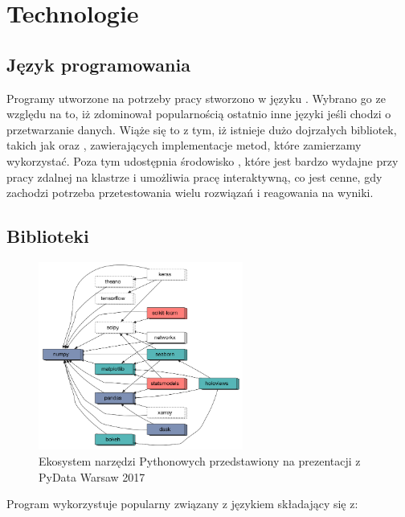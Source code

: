 \section{Technologie}\label{sec:technologie}

\subsection{Język programowania}

Programy utworzone na potrzeby pracy stworzono w języku . Wybrano go
ze względu na to, iż zdominował popularnością ostatnio inne języki jeśli chodzi o przetwarzanie danych.
Wiąże się to z tym, iż istnieje dużo dojrzałych bibliotek, takich jak 
oraz , zawierających implementacje metod, które zamierzamy wykorzystać.
Poza tym udostępnia środowisko , które jest bardzo wydajne przy
pracy zdalnej na klastrze i umożliwia pracę interaktywną, co jest cenne, gdy zachodzi
potrzeba przetestowania wielu rozwiązań i reagowania na wyniki.

\subsection{Biblioteki}

\begin{figure}[H]
    \centering
    \includegraphics[width=0.6\textwidth]{images/3_3_ecosystem}
    \caption{Ekosystem narzędzi Pythonowych przedstawiony na prezentacji z PyData Warsaw 2017\cite{thePythonEcosystem}}
    \label{fig:3_3_ecosystem}
\end{figure}

Program wykorzystuje popularny  związany z językiem  składający się z:

